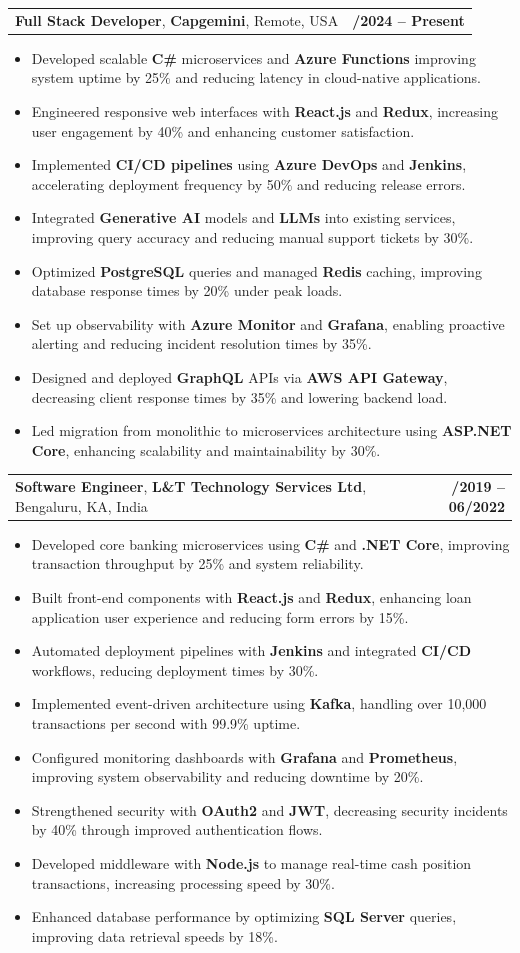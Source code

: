 \documentclass[letterpaper,11pt]{article}
\makeatletter
\newcommand{\resumeItem}[1]{
  \item\footnotesize{
    {#1 \vspace{-2pt}}
  }
}
\newcommand{\resumeSubheading}[4]{
  \vspace{-2pt}\item
    \begin{tabular*}{1.0\textwidth}[t]{l@{\extracolsep{\fill}}r}
      \textbf{\fontsize{10pt}{14pt}\selectfont #3}, \textbf{\fontsize{10pt}{14pt}\selectfont #1}, \fontsize{10pt}{14pt}\selectfont #4 & \textbf{\fontsize{10pt}{14pt}\selectfont #2} \\
    \end{tabular*}\vspace{-7pt}
}
\newcommand{\resumeItemListStart}{\begin{itemize}[leftmargin=*]}
\newcommand{\resumeItemListEnd}{\end{itemize}\vspace{-5pt}}
\makeatother
\begin{document}
    \resumeSubheading
        {Capgemini}{01/2024 -- Present}
        {Full Stack Developer}{Remote, USA}
      \resumeItemListStart
        \resumeItem{Developed scalable \textbf{C\#} microservices and \textbf{Azure Functions} improving system uptime by 25\% and reducing latency in cloud-native applications.}
        \resumeItem{Engineered responsive web interfaces with \textbf{React.js} and \textbf{Redux}, increasing user engagement by 40\% and enhancing customer satisfaction.}
        \resumeItem{Implemented \textbf{CI/CD pipelines} using \textbf{Azure DevOps} and \textbf{Jenkins}, accelerating deployment frequency by 50\% and reducing release errors.}
        \resumeItem{Integrated \textbf{Generative AI} models and \textbf{LLMs} into existing services, improving query accuracy and reducing manual support tickets by 30\%.}
        \resumeItem{Optimized \textbf{PostgreSQL} queries and managed \textbf{Redis} caching, improving database response times by 20\% under peak loads.}
        \resumeItem{Set up observability with \textbf{Azure Monitor} and \textbf{Grafana}, enabling proactive alerting and reducing incident resolution times by 35\%.}
        \resumeItem{Designed and deployed \textbf{GraphQL} APIs via \textbf{AWS API Gateway}, decreasing client response times by 35\% and lowering backend load.}
        \resumeItem{Led migration from monolithic to microservices architecture using \textbf{ASP.NET Core}, enhancing scalability and maintainability by 30\%.}
      \resumeItemListEnd

    \resumeSubheading
        {L\&T Technology Services Ltd}{08/2019 -- 06/2022}
        {Software Engineer}{Bengaluru, KA, India}
      \resumeItemListStart
        \resumeItem{Developed core banking microservices using \textbf{C\#} and \textbf{.NET Core}, improving transaction throughput by 25\% and system reliability.}
        \resumeItem{Built front-end components with \textbf{React.js} and \textbf{Redux}, enhancing loan application user experience and reducing form errors by 15\%.}
        \resumeItem{Automated deployment pipelines with \textbf{Jenkins} and integrated \textbf{CI/CD} workflows, reducing deployment times by 30\%.}
        \resumeItem{Implemented event-driven architecture using \textbf{Kafka}, handling over 10,000 transactions per second with 99.9\% uptime.}
        \resumeItem{Configured monitoring dashboards with \textbf{Grafana} and \textbf{Prometheus}, improving system observability and reducing downtime by 20\%.}
        \resumeItem{Strengthened security with \textbf{OAuth2} and \textbf{JWT}, decreasing security incidents by 40\% through improved authentication flows.}
        \resumeItem{Developed middleware with \textbf{Node.js} to manage real-time cash position transactions, increasing processing speed by 30\%.}
        \resumeItem{Enhanced database performance by optimizing \textbf{SQL Server} queries, improving data retrieval speeds by 18\%.}
      \resumeItemListEnd
\end{document}
